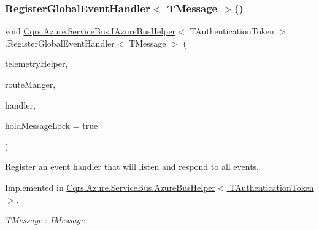 \subsubsection{\texorpdfstring{Register\+Global\+Event\+Handler$<$ T\+Message $>$()}{RegisterGlobalEventHandler< TMessage >()}}
{\footnotesize\ttfamily void \hyperlink{interfaceCqrs_1_1Azure_1_1ServiceBus_1_1IAzureBusHelper}{Cqrs.\+Azure.\+Service\+Bus.\+I\+Azure\+Bus\+Helper}$<$ T\+Authentication\+Token $>$.Register\+Global\+Event\+Handler$<$ T\+Message $>$ (\begin{DoxyParamCaption}\item[{I\+Telemetry\+Helper}]{telemetry\+Helper,  }\item[{\hyperlink{classCqrs_1_1Bus_1_1RouteManager}{Route\+Manager}}]{route\+Manger,  }\item[{Action$<$ T\+Message $>$}]{handler,  }\item[{bool}]{hold\+Message\+Lock = {\ttfamily true} }\end{DoxyParamCaption})}



Register an event handler that will listen and respond to all events. 



Implemented in \hyperlink{classCqrs_1_1Azure_1_1ServiceBus_1_1AzureBusHelper_ac1955fe076ac3ef09a2cad1121c36ba2_ac1955fe076ac3ef09a2cad1121c36ba2}{Cqrs.\+Azure.\+Service\+Bus.\+Azure\+Bus\+Helper$<$ T\+Authentication\+Token $>$}.

\begin{Desc}
\item[Type Constraints]\begin{description}
\item[{\em T\+Message} : {\em I\+Message}]\end{description}
\end{Desc}
\mbox{\label{interfaceCqrs_1_1Azure_1_1ServiceBus_1_1IAzureBusHelper_a1fe0ff74b4e5cce3d0b5a81dbaa273e0_a1fe0ff74b4e5cce3d0b5a81dbaa273e0}} 
